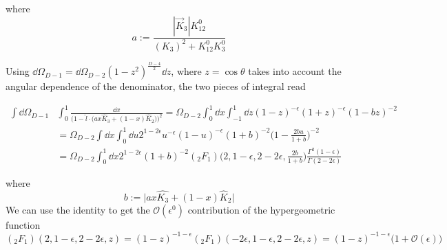 where 
\begin{equation*}
a := \frac{|\vec{K}_3|K_{12}^0}{(K_3)^2 + K_{12}^0 K_3^0}
\end{equation*}

Using $\dd\Omega_{D-1} = \dd \Omega_{D-2}(1-z^2)^{\frac{D-4}{2}}\dd z$, where $z = \cos\theta$ takes into account the angular dependence of the denominator, the two pieces of integral read

\begin{equation*}
\begin{split}
\int \dd \Omega_{D-1} &
\int_0^1\frac{\dd x}{\Big(1-\hat{l}\cdot\big(ax \hat{K}_3 + (1-x)\hat{K}_2\big)\Big)^2}
= \Omega_{D-2}\int_0^1\dd x \int_{-1}^1 \dd z (1-z)^{-\epsilon}(1+z)^{-\epsilon} (1-bz)^{-2}
\\
& = 
\Omega_{D-2}\int\dd x \int^1_0\dd u 2^{1-2\epsilon} u^{-\epsilon}(1-u)^{-\epsilon}(1+b)^{-2}\big(1-\frac{2bu}{1+b}\big)^{-2}
\\
& = 
\Omega_{D-2}\int^1_0 \dd x 2^{1-2\epsilon}(1+b)^{-2} (_2F_1)\big(2,1-\epsilon, 2-2\epsilon, \frac{2b}{1+b}\big)
\frac{\Gamma^2(1-\epsilon)}{\Gamma(2-2\epsilon)} 
\end{split}
\end{equation*}

where 
\begin{equation*}
b := \big| ax \hat{K_3} + (1-x)\hat{K}_2\big|
\end{equation*}
We can use the identity to get the $\mathcal{O}(\epsilon^{0})$ contribution of the hypergeometric function
\begin{equation*}
(_2F_1)(2,1-\epsilon, 2-2\epsilon, z) = (1-z)^{-1-\epsilon}(_2F_1)(-2\epsilon, 1-\epsilon, 2-2\epsilon, z)
=(1-z)^{-1-\epsilon}\big(1+\mathcal{O}(\epsilon)\big)
\end{equation*}

\color{black}
\fi
\\

